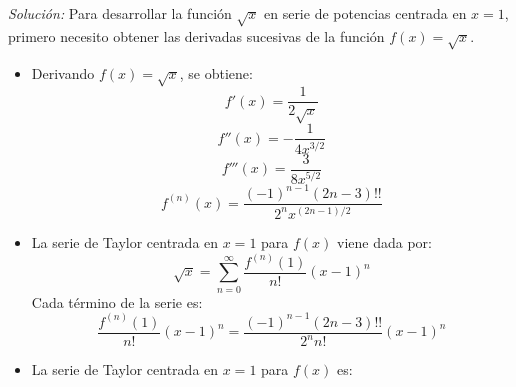 \documentclass{article}
\newenvironment{solution}
    {\textit{Solución:}}
    {}
\begin{document}
\begin{solution}
    Para desarrollar la función $\sqrt{x}$ en serie de potencias centrada en $x = 1$, primero necesito obtener las derivadas sucesivas de la función $f(x) = \sqrt{x}$.
    \begin{itemize}
        \item Derivando $f(x) = \sqrt{x}$, se obtiene:
        $$f'(x) = \frac{1}{2\sqrt{x}}$$
        $$f''(x) = -\frac{1}{4x^{3/2}}$$
        $$f'''(x) = \frac{3}{8x^{5/2}}$$
        $$f^{(n)}(x) = \frac{(-1)^{n-1}(2n-3)!!}{2^n x^{(2n-1)/2}}$$
        \item La serie de Taylor centrada en $x = 1$ para $f(x)$ viene dada por:
        $$\sqrt{x} = \sum_{n=0}^\infty \frac{f^{(n)}(1)}{n!}(x-1)^n$$
        Cada término de la serie es:
        $$\frac{f^{(n)}(1)}{n!}(x-1)^n = \frac{(-1)^{n-1}(2n-3)!!}{2^n n!}(x-1)^n$$
        \item La serie de Taylor centrada en $x = 1$ para $f(x)$ es:
    \end{itemize}
\end{solution}
\end{document}
